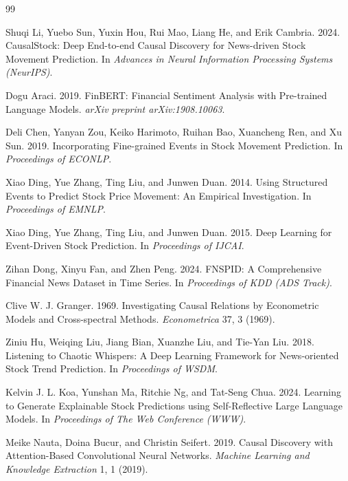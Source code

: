 \documentclass[sigconf,nonacm]{acmart}
\begin{document}
\begin{thebibliography}{99}

Shuqi Li, Yuebo Sun, Yuxin Hou, Rui Mao, Liang He, and Erik Cambria.
2024.
\newblock CausalStock: Deep End-to-end Causal Discovery for News-driven
Stock Movement Prediction.
\newblock In \emph{Advances in Neural Information Processing Systems
(NeurIPS)}.

Dogu Araci. 2019.
\newblock FinBERT: Financial Sentiment Analysis with Pre-trained Language
Models.
\newblock \emph{arXiv preprint arXiv:1908.10063}.

Deli Chen, Yanyan Zou, Keiko Harimoto, Ruihan Bao, Xuancheng Ren, and
Xu Sun. 2019.
\newblock Incorporating Fine-grained Events in Stock Movement Prediction.
\newblock In \emph{Proceedings of ECONLP}.

Xiao Ding, Yue Zhang, Ting Liu, and Junwen Duan. 2014.
\newblock Using Structured Events to Predict Stock Price Movement: An
Empirical Investigation.
\newblock In \emph{Proceedings of EMNLP}.

Xiao Ding, Yue Zhang, Ting Liu, and Junwen Duan. 2015.
\newblock Deep Learning for Event-Driven Stock Prediction.
\newblock In \emph{Proceedings of IJCAI}.

Zihan Dong, Xinyu Fan, and Zhen Peng. 2024.
\newblock FNSPID: A Comprehensive Financial News Dataset in Time Series.
\newblock In \emph{Proceedings of KDD (ADS Track)}.

Clive W. J. Granger. 1969.
\newblock Investigating Causal Relations by Econometric Models and
Cross-spectral Methods.
\newblock \emph{Econometrica} 37, 3 (1969).

Ziniu Hu, Weiqing Liu, Jiang Bian, Xuanzhe Liu, and Tie-Yan Liu. 2018.
\newblock Listening to Chaotic Whispers: A Deep Learning Framework for
News-oriented Stock Trend Prediction.
\newblock In \emph{Proceedings of WSDM}.

Kelvin J. L. Koa, Yunshan Ma, Ritchie Ng, and Tat-Seng Chua. 2024.
\newblock Learning to Generate Explainable Stock Predictions using
Self-Reflective Large Language Models.
\newblock In \emph{Proceedings of The Web Conference (WWW)}.

Meike Nauta, Doina Bucur, and Christin Seifert. 2019.
\newblock Causal Discovery with Attention-Based Convolutional Neural
Networks.
\newblock \emph{Machine Learning and Knowledge Extraction} 1, 1 (2019).


\end{thebibliography}
\end{document}
